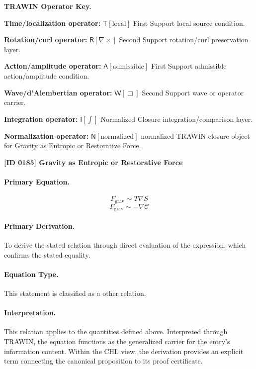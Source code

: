 \par\vspace{0.45\baselineskip}
\noindent\begin{minipage}[t]{\linewidth}
\begingroup
\small
\raggedright
\textbf{TRAWIN Operator Key.}\par
\noindent\textbf{Time/localization operator:} $\mathsf{T}\!\left[\mathrm{local}\right]$ First Support local source condition.\par
\noindent\textbf{Rotation/curl operator:} $\mathsf{R}\!\left[\nabla\times\right]$ Second Support rotation/curl preservation layer.\par
\noindent\textbf{Action/amplitude operator:} $\mathsf{A}\!\left[\mathrm{admissible}\right]$ First Support admissible action/amplitude condition.\par
\noindent\textbf{Wave/d'Alembertian operator:} $\mathsf{W}\!\left[\Box\right]$ Second Support wave or operator carrier.\par
\noindent\textbf{Integration operator:} $\mathsf{I}\!\left[\int\right]$ Normalized Closure integration/comparison layer.\par
\noindent\textbf{Normalization operator:} $\mathsf{N}\!\left[\mathrm{normalized}\right]$ normalized TRAWIN closure object for Gravity as Entropic or Restorative Force.\par
\endgroup
\end{minipage}

\clearpage
\noindent\textbf{[ID 0185] Gravity as Entropic or Restorative Force}\par
\vspace{0.35em}
\paragraph{Primary Equation.}
\[
F_{\mathrm{grav}} \sim T\nabla S
\]
\[
F_{\mathrm{grav}} \sim -\nabla \mathcal{C}
\]

\paragraph{Primary Derivation.}
To derive the stated relation through direct evaluation of the expression. which confirms the stated equality.
\paragraph{Equation Type.}
This statement is classified as a other relation.

\paragraph{Interpretation.}
This relation applies to the quantities defined above. Interpreted through TRAWIN, the equation functions as the generalized carrier for the entry’s information content. Within the CHL view, the derivation provides an explicit term connecting the canonical proposition to its proof certificate.

